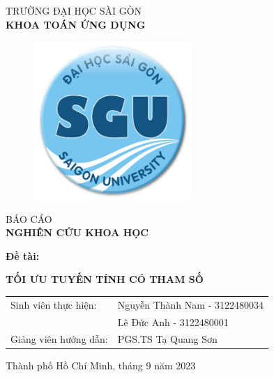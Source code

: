 \documentclass{article} %
\begin{document}
\cleardoublepage
\thispagestyle{empty}
\begin{center}
    \vspace{-15pt} TRƯỜNG ĐẠI HỌC SÀI GÒN\\
    \textbf{\fontsize{16pt}{0pt}\selectfont KHOA TOÁN ỨNG DỤNG}
    \vspace{0.5cm}
\begin{figure}[H]
        \centering
        \includegraphics[width=6cm,height=6cm]{bianckh.png}
\end{figure}
    \vspace{1.5cm}
    \fontsize{24pt}{0pt}\selectfont BÁO CÁO\\
    \vspace{12pt}
    \textbf{\fontsize{32pt}{0pt}\selectfont NGHIÊN CỨU KHOA HỌC}
    \vspace{1.5cm}
\end{center}
    \hspace{20pt}\textbf{\fontsize{14pt}{0pt}\selectfont Đề tài:}
\begin{center}
    \textbf{\fontsize{20pt}{0pt}\selectfont TỐI ƯU TUYẾN TÍNH CÓ THAM SỐ} 
    \vspace{1cm}
\begin{table}[H]
        \centering
        \begin{tabular}{l l}
    \fontsize{14pt}{0pt}\selectfont Sinh viên thực hiện:     & \fontsize{14pt}{0pt}\selectfont Nguyễn Thành Nam - 3122480034 \vspace{6pt}\\     
                                                             & \fontsize{14pt}{0pt}\selectfont Lê Đức Anh - 3122480001 \vspace{6pt}\\
    \fontsize{14pt}{0pt}\selectfont Giảng viên hướng dẫn: & \fontsize{14pt}{0pt}\selectfont PGS.TS Tạ Quang Sơn
\end{tabular}
\end{table}
    \vspace{1.5cm}
    \fontsize{14pt}{0pt}\selectfont Thành phố Hồ Chí Minh, tháng 9 năm 2023
\end{center}
\cleardoublepage
\end{document}
